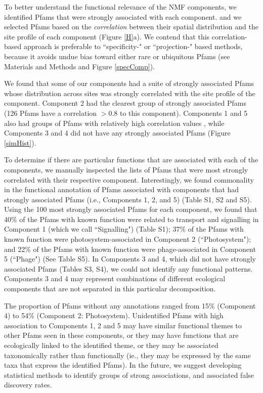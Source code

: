 To better understand the functional relevance of the NMF components, we identified Pfams that were strongly associated with each component.   and we selected Pfams based on the \emph{correlation} between their spatial distribution and the site profile of each component (Figure \ref{H}a).  We contend that this correlation-based approach is preferable to ``specificity-" \cite{JianWeit12} or ``projection-" \cite{CarmPasc06, KimPark07} based methods, because it avoids undue bias toward either rare or ubiquitous Pfams (see Materials and Methods and Figure \ref{specComp}).

We found that some of our components had a suite of strongly associated Pfams whose distribution across sites was strongly correlated with the site profile of the component. Component 2 had the clearest group of strongly associated Pfams (126 Pfams have a correlation $> 0.8$ to this component).  Components 1 and 5 also had groups of Pfams with relatively high correlation values , while Components 3 and 4 did not have any strongly associated Pfams (Figure \ref{simHist}). 

To determine if there are particular functions that are associated with each of the components, we manually inspected the lists of Pfams that were most strongly correlated with their respective component. Interestingly, we found commonality in the functional annotation of Pfams associated with components that had strongly associated Pfams (i.e., Components 1, 2, and 5) (Table S1, S2 and S5). Using the 100 most strongly associated Pfams for each component, we found that 40\% of the Pfams with known function were related to transport and signalling in Component 1 (which we call ``Signalling") (Table S1); 37\% of the Pfams with known function were photosystem-associated in Component 2 (``Photosystem"); and 22\% of the Pfams with known function were phage-associated in Component 5 (``Phage") (See Table S5). In Components 3 and 4, which did not have strongly associated Pfams (Tables S3, S4), we could not identify any functional patterns.  Components 3 and 4 may represent combinations of different ecological components that are not separated in this particular decomposition. 

The proportion of Pfams without any annotations ranged from 15\% (Component 4) to 54\% (Component 2: Photosystem). Unidentified Pfams with high association to Components 1, 2 and 5 may have similar functional themes to other Pfams seen in these components, or they may have functions that are ecologically linked to the identified theme, or they may be associated taxonomically rather than functionally (ie., they may be expressed by the same taxa that express the identified Pfams).  In the future, we suggest developing statistical methods to identify groups of strong associations, and associated false discovery rates.

